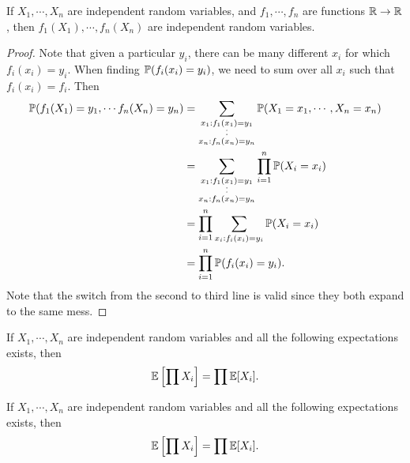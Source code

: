 %
\begin{note}
  \begin{field}
    \begin{thm}
      If $X_1, \cdots, X_n$ are independent random variables, and $f_1, \cdots, f_n$ are functions $\R \to \R$, then $f_1(X_1), \cdots, f_n(X_n)$ are independent random variables.
    \end{thm}
  \end{field}
  \begin{field}
    \begin{proof}
      Note that given a particular $y_i$, there can be many different $x_i$ for which $f_i(x_i) = y_i$. When finding $\P(f_i(x_i)= y_i)$, we need to sum over all $x_i$ such that $f_i(x_i) = f_i$. Then
      \begin{align*}
        \P(f_1(X_1) = y_1, \cdots f_n(X_n) = y_n) &= \sum_{\substack{x_1: f_1(x_1) = y_1\\\cdot\vspace{-2pt}\\\cdot\\x_n: f_n(x_n) = y_n}} \P(X_1 = x_1, \cdots, X_n = x_n)\\
        &= \sum_{\substack{x_1: f_1(x_1) = y_1\\\cdot\vspace{-2pt}\\\cdot\\x_n: f_n(x_n) = y_n}} \prod_{i = 1}^n \P(X_i = x_i)\\
        &= \prod_{i = 1}^n \sum_{x_i:f_i(x_i) = y_i} \P(X_i = x_i)\\
        &= \prod_{i = 1}^n \P(f_i(x_i) = y_i).
      \end{align*}
      Note that the switch from the second to third line is valid since they both expand to the same mess.
    \end{proof}
  \end{field}
  \xplain{}%
\end{note}

\begin{note}
  \begin{field}
    \begin{thm}
      If $X_1, \cdots, X_n$ are independent random variables and all the following expectations exists, then
      \[
        \E\left[\prod X_i\right] = \prod \E[X_i].
      \]
    \end{thm}
  \end{field}
  \begin{field}
    \begin{thm}
      If $X_1, \cdots, X_n$ are independent random variables and all the following expectations exists, then
      \[
        \E\left[\prod X_i\right] = \prod \E[X_i].
      \]
    \end{thm}
  \end{field}
  \xplain{}%
\end{note}

